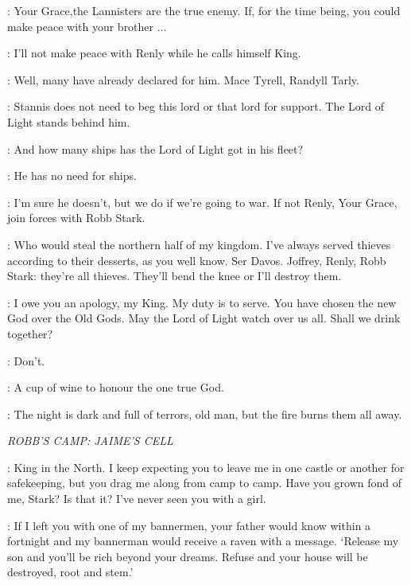 \DAVOS: Your Grace,the Lannisters are the true enemy. If, for the time being, you could make peace with your brother $\ldots$

\STANNIS: I'll not make peace with Renly while he calls himself King.

\DAVOS: Well, many have already declared for him. Mace Tyrell, Randyll Tarly.

\MELISANDRE: Stannis does not need to beg this lord or that lord for support. The Lord of Light stands behind him.

\DAVOS: And how many ships has the Lord of Light got in his fleet?

\MELISANDRE: He has no need for ships.

\DAVOS: I'm sure he doesn't, but we do if we're going to war. If not Renly, Your Grace, join forces with Robb Stark.

\STANNIS: Who would steal the northern half of my kingdom. I've always served thieves according to their desserts, as you well know. Ser Davos. Joffrey, Renly, Robb Stark: they're all thieves. They'll bend the knee or I'll destroy them.

\CRESSEN:  I owe you an apology, my King. My duty is to serve. You have chosen the new God over the Old Gods. May the Lord of Light watch over us all.  Shall we drink together?

\DAVOS: Don't.

\CRESSEN: A cup of wine to honour the one true God.


\MELISANDRE: The night is dark and full of terrors, old man, but the fire burns them all away.


\scene

\textit{ROBB'S CAMP: JAIME'S CELL}


\JAIME: King in the North. I keep expecting you to leave me in one castle or another for safekeeping, but you drag me along from camp to camp. Have you grown fond of me, Stark? Is that it? I've never seen you with a girl.

\ROBB: If I left you with one of my bannermen, your father would know within a fortnight and my bannerman would receive a raven with a message. `Release my son and you'll be rich beyond your dreams. Refuse and your house will be destroyed, root and stem.'

